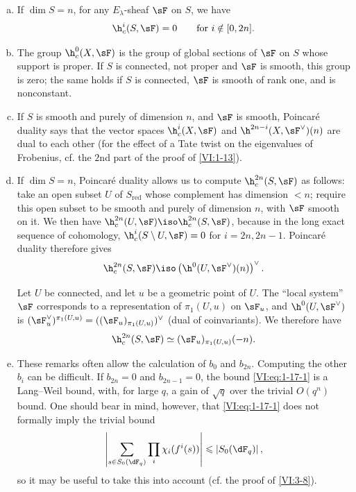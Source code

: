 \documentclass[oneside]{book}
\begin{document}
\begin{enumerate}[a)]
  \item If $\dim S=n$, for any $E_\lambda$-sheaf $\sF$ on $S$, we have 
    \[
      \h_c^i(S,\sF) = 0 \qquad \text{for $i\notin [0,2n]$.}
    \]
  \item The group $\h_c^0(X,\sF)$ is the group of global sections of $\sF$ 
    on $S$ whose support is proper. If $S$ is connected, not proper and 
    $\sF$ is smooth, this group is zero; the same holds if $S$ is connected, 
    $\sF$ is smooth of rank one, and is nonconstant.
  \item If $S$ is smooth and purely of dimension $n$, and $\sF$ is smooth, 
    Poincaré duality says that the vector spaces 
    $\h_c^i(X,\sF)$ and $\h^{2n-i}(X,\sF^\vee)(n)$ are dual to each other 
    (for the effect of a Tate twist on the eigenvalues of Frobenius, 
    cf. the $2$nd part of the proof of \ref{VI:1-13}).
  \item If $\dim S=n$, Poincaré duality allows us to compute 
    $\h_c^{2n}(S,\sF)$ as follows: take an open subset $U$ of $S_\text{red}$ 
    whose complement has dimension $<n$; require this open subset to be smooth and 
    purely of dimension $n$, with $\sF$ smooth on it. We then have 
    $\h_c^{2n}(U,\sF) \iso \h_c^{2n}(S,\sF)$, because in the long exact sequence 
    of cohomology, $\h_c^i(S\setminus U,\sF) = 0$ for $i=2n,2n-1$. 
    Poincaré duality therefore gives 
    \[
      \h_c^{2n}(S,\sF) \iso \left(\h^0(U,\sF^\vee)(n)\right)^\vee \text{.}
    \]
    
    Let $U$ be connected, and let $u$ be a geometric point of $U$. The 
    ``local system'' $\sF$ corresponds to a representation of 
    $\pi_1(U,u)$ on $\sF_u$, and $\h^0(U,\sF^\vee)$ is 
    $(\sF_u^\vee)^{\pi_1(U,u)}=((\sF_u)_{\pi_1(U,u)})^\vee$ (dual of 
    coinvariants). We therefore have 
    \[
      \h_c^{2n}(S,\sF) \simeq (\sF_u)_{\pi_1(U,u)}(-n) \text{.}
    \]
  \item These remarks often allow the calculation of $b_0$ and $b_{2n}$. 
    Computing the other $b_i$ can be difficult. If $b_{2n}=0$ and 
    $b_{2n-1}=0$, the bound \eqref{VI:eq:1-17-1} is a Lang--Weil bound, 
    with, for large $q$, a gain of $\sqrt q$ over the 
    trivial $O(q^n)$ bound. One should bear in mind, however, that 
    \eqref{VI:eq:1-17-1} does not formally imply the trivial bound 
    \[
      \left|\sum_{s\in S_0(\dF_q)} \prod_i \chi_i(f^i(s))\right| \leqslant \left| S_0(\dF_q)\right| \text{,}
    \]
    so it may be useful to take this into account (cf. the proof of \ref{VI:3-8}). 
\end{enumerate}
\end{document}
